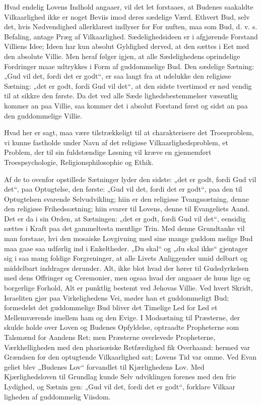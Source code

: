 \documentclass[12pt]{book}
\newcommand{\opage}[1]{\marginnote{\footnotesize\textit{[#1]}}}
\begin{document}
Hvad endelig Lovens Indhold angaaer, vil det let
forstaaes, at Budenes saakaldte Vilkaarlighed ikke er
noget Beviis imod deres sædelige Værd. Ethvert Bud,
selv det, hvis Nødvendighed allerklarest indlyser for For\-%
nuften, maa som Bud, d. v. s. Befaling, antage Præg af
Vilkaarlighed. Sædelighedsideen er i afgjørende Forstand
Villiens Idee; Ideen har kun absolut Gyldighed derved,
at den sættes i Eet med den absolute Villie. Men heraf
følger igjen, at alle Sædelighedens oprindelige Fordringer
maae udtrykkes i Form af guddommelige Bud. Den
sædelige Sætning: „Gud vil det, fordi det er godt“, er
saa langt fra at udelukke den religiøse Sætning: „det er
godt, fordi Gud vil det“, at den sidste tvertimod er nød\-%
vendig til at sikkre den første. Da det ved alle Sæde\-%
lighedsbestemmelser væsentlig kommer an paa Villie, saa
kommer det i absolut Forstand først og sidst an paa den
guddommelige Villie.

Hvad her er sagt, maa være tilstrækkeligt til at
charakterisere det Troesproblem, vi kunne fastholde
under Navn af det religiøse Vilkaarlighedsproblem, et
Problem, der til sin fuldstændige Løsning vil kræve en
gjennemført Troespsychologie, Religionsphilosophie og
Ethik.

Af de to ovenfor opstillede Sætninger lyder den
sidste: „det er godt, fordi Gud vil det“, paa Optugtelse,
den første: „Gud vil det, fordi det er godt“, paa den til
Optugtelsen svarende Selvudvikling; hiin er den religiøse
Tvangssætning, denne den religiøse Frihedssætning; hiin
svarer til Lovens, denne til Evangeliets Aand. Det er
da i sin Orden, at Sætningen: „det er godt, fordi Gud
vil det“, eensidig sættes i Kraft paa det gammeltesta\-%
mentlige Trin. Med denne Grundtanke vil man forstaae,
hvi den mosaiske Lovgivning med sine mange guddom\-%
\opage{193}\setcounter{footnote}{0}%
melige Bud maa gaae saa udførlig ind i Enkeltheder.
„Du skal“ og „du skal ikke“ gjentager sig i saa mang\-%
foldige Forgreninger, at alle Livets Anliggender umid\-%
delbart og middelbart inddrages derunder. Alt, ikke
blot hvad der hører til Gudsdyrkelsen med dens Offringer
og Ceremonier, men ogsaa hvad der angaaer de huus\-%
lige og borgerlige Forhold, Alt er punktlig bestemt ved
Jehovas Villie. Ved hvert Skridt, Israeliten gjør paa
Virkelighedens Vei, møder han et guddommeligt Bud;
formedelst det guddommelige Bud bliver det Timelige Led
for Led et Mellemværende imellem ham og den Evige. I
Modsætning til Præsterne, der skulde holde over Loven og
Budenes Opfyldelse, optraadte Propheterne som Talsmænd
for Aandens Ret; men Præsterne overlevede Propheterne,
Værkhelligheden med den pharisæiske Retfærdighed fik
Overhaand: hermed var Grændsen for den optugtende
Vilkaarlighed sat; Lovens Tid var omme. Ved Evan\-%
geliet blev „Budenes Lov“ forvandlet til Kjærlighedens
Lov. Med Kjærlighedsloven til Grundlag kunde Selv\-%
udviklingen forenes med den frie Lydighed, og Sætnin\-%
gen: „Gud vil det, fordi det er godt“, forklare Vilkaar\-%
ligheden af guddommelig Viisdom.
\end{document}
